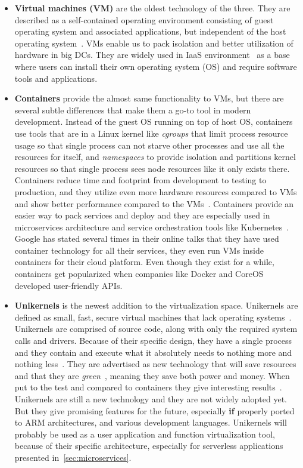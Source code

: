 \begin{itemize}
	\item \textbf{Virtual machines (VM)} are the oldest technology of the three. They are described as a self-contained operating environment consisting of guest operating system and associated applications, but independent of the host operating system~\cite{Sharma}. VMs enable us to pack isolation and better utilization of hardware in big DCs. They are widely used in IaaS environment~\cite{AbsalomBJ13, YangHCLW13} as a base where users can install their own operating system (OS) and require software tools and applications.
	\item \textbf{Containers} provide the almost same functionality to VMs, but there are several subtle differences that make them a go-to tool in modern development. Instead of the guest OS running on top of host OS, containers use tools that are in a Linux kernel like \textit{cgroups} that limit process resource usage so that single process can not starve other processes and use all the resources for itself, and \textit{namespaces} to provide isolation and partitions kernel resources so that single process sees node resources like it only exists there. Containers reduce time and footprint from development to testing to production, and they utilize even more hardware resources compared to VMs and show better performance compared to the VMs~\cite{Seo2014PerformanceCA, FelterFRR15}. Containers provide an easier way to pack services and deploy and they are especially used in microservices architecture and service orchestration tools like Kubernetes~\cite{BurnsGOBW16}. Google has stated several times in their online talks that they have used container technology for all their services, they even run VMs inside containers for their cloud platform. Even though they exist for a while, containers get popularized when companies like Docker and CoreOS developed user-friendly APIs.
	\item \textbf{Unikernels} is the newest addition to the virtualization space. Unikernels are defined as small, fast, secure virtual machines that lack operating systems~\cite{pavlicek2016unikernels}. Unikernels are comprised of source code, along with only the required system calls and drivers. Because of their specific design, they have a single process and they contain and execute what it absolutely needs to nothing more and nothing less~\cite{GoethalsSAVT18}. They are advertised as new technology that will save resources and that they are \textit{green}~\cite{208735}, meaning they save both power and money. When put to the test and compared to containers they give interesting results~\cite{GoethalsSAVT18, PlauthFP17}. Unikernels are still a new technology and they are not widely adopted yet. But they give promising features for the future, especially \textbf{if} properly ported to ARM architectures, and various development languages. Unikernels will probably be used as a user application and function virtualization tool, because of their specific architecture, especially for serverless applications presented in~\ref{sec:microservices}.
\end{itemize}

